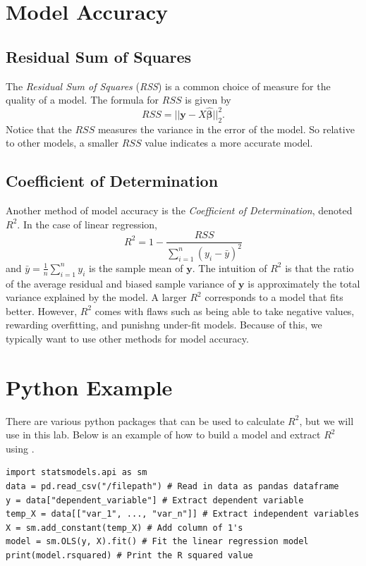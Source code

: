 \section*{Model Accuracy}

\subsection*{Residual Sum of Squares}
The \textit{Residual Sum of Squares} (\textit{RSS}) is a common choice of measure for the quality of a model.
The formula for $RSS$ is given by \[ RSS = \vert\vert \boldsymbol y - X\widehat{\boldsymbol\beta} \vert\vert _2^2. \]
Notice that the $RSS$ measures the variance in the error of the model. So relative to other models, a smaller $RSS$ value indicates a more accurate model.

\subsection*{Coefficient of Determination}
Another method of model accuracy is the \textit{Coefficient of Determination}, denoted $R^2$. In the case of linear regression,
\[ R^2 =1 - \frac{RSS}{\sum_{i=1}^n(y_i - \bar{y})^2} \]
and $\bar{y}= \frac{1}{n}\sum_{i=1}^n y_i$ is the sample mean of $\boldsymbol y$.
The intuition of $R^2$ is that the ratio of the average residual and biased sample variance of $\boldsymbol y$ is approximately the total variance explained by the model.
A larger $R^2$ corresponds to a model that fits better. However, $R^2$ comes with flaws such as being able to take negative values, rewarding overfitting, and punishng under-fit models.
Because of this, we typically want to use other methods for model accuracy.

\section*{Python Example}
There are various python packages that can be used to calculate $R^2$, but we will use  in this lab.
Below is an example of how to build a model and extract $R^2$ using .

\begin{lstlisting}
import statsmodels.api as sm
data = pd.read_csv("/filepath") # Read in data as pandas dataframe
y = data["dependent_variable"] # Extract dependent variable
temp_X = data[["var_1", ..., "var_n"]] # Extract independent variables
X = sm.add_constant(temp_X) # Add column of 1's
model = sm.OLS(y, X).fit() # Fit the linear regression model
print(model.rsquared) # Print the R squared value
\end{lstlisting}

